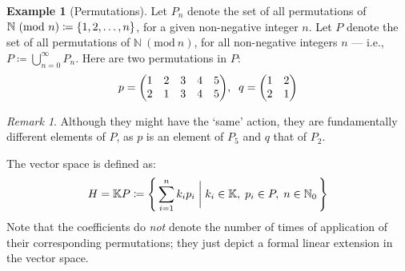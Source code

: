 \documentclass[svgnames]{article}
\theoremstyle{definition}
\newtheorem{Example}{Example}
\theoremstyle{remark}
\newtheorem*{Remark*}{Remark}
\theoremstyle{underline}
\theoremstyle{underline}
\newcommand{\Mod}[1]{\ (\mathrm{mod}\ #1)}
\begin{document}
	\begin{Example}[Permutations]
		Let $P_n$ denote the set of all permutations of $\mathbb N\Mod n \coloneqq \qty{1, 2, \ldots, n}$, for a given non-negative integer $n$. Let $P$ denote the set of all permutations of $\mathbb N \Mod n$, for all non-negative integers $n$ --- i.e., $P \coloneqq \bigcup\limits_{n = 0}^\infty P_n$. Here are two permutations in $P$:
		\begin{gather*}
		p = \mqty(1 & 2 & 3 & 4 & 5 \\ 2 & 1 & 3 & 4 & 5), \;\; q = \mqty(1 & 2 \\ 2 & 1) 
		\end{gather*}
		
		\begin{Remark*}
			Although they might have the `same' action, they are fundamentally different elements of $P$, as $p$ is an element of $P_5$ and $q$ that of $P_2$.
		\end{Remark*}
		
		The vector space is defined as:
		\begin{gather*}
		H = \mathbb KP \coloneqq \qty{\, \sum_{i = 1}^n k_i p_i \;\bigg|\; k_i \in \mathbb K,\; p_i \in P,\; n \in \mathbb N_0\,}
		\end{gather*}
		Note that the coefficients do \emph{not} denote the number of times of application of their corresponding permutations; they just depict a formal linear extension in the vector space.
		

\end{Example}
\end{document}
